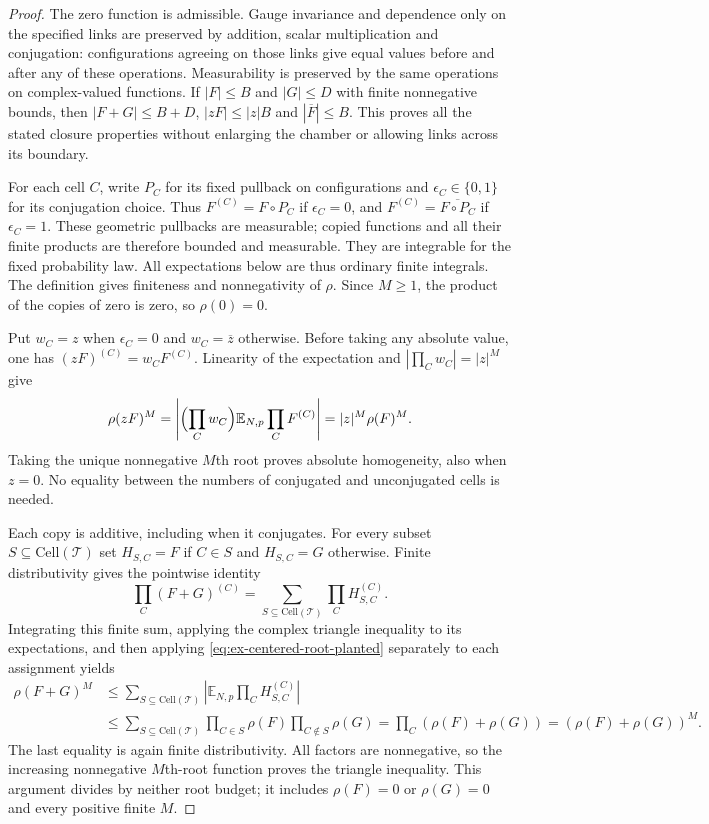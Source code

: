\begin{proof}
The zero function is admissible. Gauge invariance and dependence only on
the specified links are preserved by addition, scalar multiplication and
conjugation: configurations agreeing on those links give equal values
before and after any of these operations. Measurability is preserved by
the same operations on complex-valued functions. If $|F|\leq B$ and
$|G|\leq D$ with finite nonnegative bounds, then
$|F+G|\leq B+D$, $|zF|\leq|z|B$ and $|\overline F|\leq B$.
This proves all the stated closure properties without enlarging the
chamber or allowing links across its boundary.

For each cell $C$, write $P_C$ for its fixed pullback on configurations
and $\epsilon_C\in\{0,1\}$ for its conjugation choice. Thus
$F^{(C)}=F\circ P_C$ if $\epsilon_C=0$, and
$F^{(C)}=\overline{F\circ P_C}$ if $\epsilon_C=1$.
These geometric pullbacks are measurable; copied functions and all their
finite products are therefore bounded and measurable. They are integrable
for the fixed probability law. All expectations below are thus ordinary
finite integrals. The definition gives finiteness and nonnegativity of
$\rho$. Since $M\geq1$, the product of the copies of zero is zero, so
$\rho(0)=0$.

Put $w_C=z$ when $\epsilon_C=0$ and $w_C=\overline z$ otherwise.
Before taking any absolute value, one has
$(zF)^{(C)}=w_CF^{(C)}$. Linearity of the expectation and
$|\prod_Cw_C|=|z|^M$ give
\[
 \rho(zF)^M
 =\left|\Bigl(\prod_C w_C\Bigr)
              \mathbb E_{N,p}\prod_CF^{(C)}\right|
 =|z|^M\rho(F)^M.
\]
Taking the unique nonnegative $M$th root proves absolute homogeneity,
also when $z=0$. No equality between the numbers of conjugated and
unconjugated cells is needed.

Each copy is additive, including when it conjugates. For every subset
$S\subseteq\mathrm{Cell}(\mathcal T)$ set $H_{S,C}=F$ if $C\in S$
and $H_{S,C}=G$ otherwise. Finite distributivity gives the pointwise identity
\[
 \prod_C(F+G)^{(C)}=\sum_{S\subseteq\mathrm{Cell}(\mathcal T)}
                         \prod_C H_{S,C}^{(C)}.
\]
Integrating this finite sum, applying the complex triangle inequality to
its expectations, and then applying
\eqref{eq:ex-centered-root-planted} separately to each assignment yields
\[
 \begin{aligned}
 \rho(F+G)^M
 &\leq\sum_{S\subseteq\mathrm{Cell}(\mathcal T)}
          \left|\mathbb E_{N,p}\prod_C H_{S,C}^{(C)}\right|\\
 &\leq\sum_{S\subseteq\mathrm{Cell}(\mathcal T)}
          \prod_{C\in S}\rho(F)\prod_{C\notin S}\rho(G)
   =\prod_C(\rho(F)+\rho(G))
   =(\rho(F)+\rho(G))^M.
 \end{aligned}
\]
The last equality is again finite distributivity. All factors are
nonnegative, so the increasing nonnegative $M$th-root function proves
the triangle inequality. This argument divides by neither root budget;
it includes $\rho(F)=0$ or $\rho(G)=0$ and every positive finite $M$.


\end{proof}

